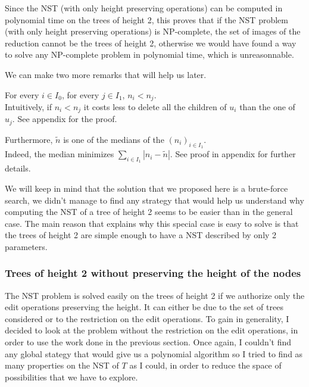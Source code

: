 Since the NST (with only height preserving operations) can be computed
in polynomial time on the trees of height 2, this proves that if the
NST problem (with only height preserving operations) is NP-complete,
the set of images of the reduction cannot be the trees of height 2,
otherwise we would have found a way to solve any NP-complete problem
in polynomial time, which is unreasonnable.

We can make two more remarks that will help us later. 

\begin{remark} 
  For every $i \in I_{0}$, for
  every $j \in I_{1}$, $n_{i} < n_{j}$.\\
  Intuitively, if $n_{i} < n_{j}$ it costs less to delete all the
  children of $u_{i}$ than the one of $u_{j}$. See appendix for the proof.
\end{remark}

\begin{remark}
  Furthermore, $\tilde{n}$ is one of the medians of the
  $(n_{i})_{i \in I_{1}}$. \\
  Indeed, the median minimizes
  $\sum_{i \in I_{1}} \left| n_{i} - \tilde{n} \right|$. See proof in
  appendix for further details.
\end{remark}

We will keep in mind that the solution that we proposed here is a
brute-force search, we didn't manage to find any strategy that would
help us understand why computing the NST of a tree of height 2 seems
to be easier than in the general case. The main reason that explains
why this special case is easy to solve is that the trees of height 2
are simple enough to have a NST described by only 2 parameters.

\subsubsection{Trees of height 2 without preserving the height of the
  nodes}

The NST problem is solved easily on the trees of height 2 if we
authorize only the edit operations preserving the height. It can
either be due to the set of trees considered or to the restriction on
the edit operations. To gain in generality, I decided to look at the
problem without the restriction on the edit operations, in order to
use the work done in the previous section. Once again, I couldn't find
any global stategy that would give us a polynomial algorithm so I
tried to find as many properties on the NST of $T$ as I could, in
order to reduce the space of possibilities that we have to explore.


